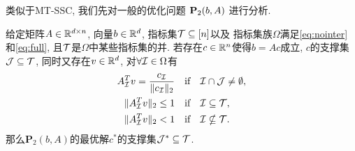 类似于MT-SSC, 我们先对一般的优化问题 $\mathbf{P}_2(b,A)$ 进行分析.
\begin{lemma}\label{lem:prim_dual}
  给定矩阵$A\in\mathbb{R}^{d\times n}$, 向量$b\in \mathbb{R}^d$, 指标集$\mathcal{T}\subseteq [n]$以及
  指标集族$\Omega$满足\eqref{eq:nointer} 和\eqref{eq:full}, 
  且$\mathcal{T}$是$\Omega$中某些指标集的并.
  若存在$c\in \mathbb{R}^n $使得$b = Ac$成立, $c$的支撑集$\mathcal{J} \subseteq \mathcal{T}$,
  同时又存在$v\in\mathbb{R}^d$, 对$\forall \mathcal{I} \in \Omega$有
  \begin{align}
    A^T_{\mathcal{I}} v= \frac{c_{\mathcal{I}}}{\|c_{\mathcal{I}}\|_2} \quad& \text{if}\quad \mathcal{I} \cap \mathcal{J} \neq
    \emptyset,\label{eq:group_c1}\\
    \|A^T_{\mathcal{I}} v\|_2 \le  1 \quad &\text{if}\quad \mathcal{I} \subseteq \mathcal{T},\label{eq:group_c2} \\
    \|A^T_{\mathcal{I}} v\|_2< 1\quad &\text{if}\quad \mathcal{I} \nsubseteq \mathcal{T}\label{eq:group_c3}.
  \end{align}
  那么$\mathbf{P}_2(b,A)$的最优解$c^*$的支撑集$\mathcal{J}^*\subseteq \mathcal{T}$.
\end{lemma}
